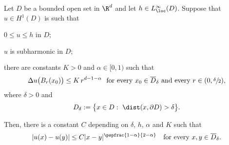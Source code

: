 \begin{lemma}\label{l:holder}
Let $D$ be a bounded open set in $\R^d$ and let $h\in L^\infty_{\loc}(D)$.
Suppose that $u\in H^1(D)$ is such that
\begin{enumeratea}
\item $0\le u\le h$ in $D$;
\item $u$ is subharmonic in $D$;
\item there are constants $K>0$ and $\alpha\in[0,1)$ such that
\begin{equation}\label{e:opt_cond_balls}
\Delta u\big(B_r(x_0)\big)\le K\,r^{d-1-\alpha}\ \text{ for every } x_0\in \overline D_\delta\text{ and every $r\in(0,\sfrac\delta2)$},
\end{equation}
where $\delta>0$ and
\begin{equation}\label{e:Ddelta}
D_\delta:=\big\{x\in D:\ \dist(x,\partial D)> \delta\big\}.
\end{equation}
\end{enumeratea}
Then, there is a constant $C$ depending on $\delta$, $h$, $\alpha$ and $K$ such that
\[|u(x)-u(y)|\le C|x-y|^{\pspfrac{1-\alpha}{2-\alpha}}\quad\text{for every } x,y\in \overline D_\delta.\]
\end{lemma}
